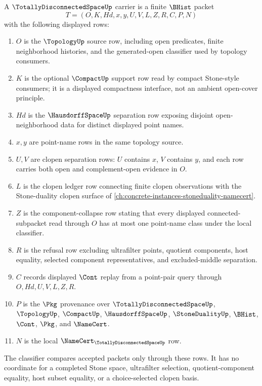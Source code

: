 \begin{definition}
\label{def:totally-disconnected-space-carrier}
A $\TotallyDisconnectedSpaceUp$ carrier is a finite $\BHist$ packet
$$
T=(O,K,Hd,x,y,U,V,L,Z,R,C,P,N)
$$
with the following displayed rows:
\begin{enumerate}
\item $O$ is the $\TopologyUp$ source row, including open predicates, finite neighborhood histories, and the generated-open classifier used by topology consumers.
\item $K$ is the optional $\CompactUp$ support row read by compact Stone-style consumers; it is a displayed compactness interface, not an ambient open-cover principle.
\item $Hd$ is the $\HausdorffSpaceUp$ separation row exposing disjoint open-neighborhood data for distinct displayed point names.
\item $x,y$ are point-name rows in the same topology source.
\item $U,V$ are clopen separation rows: $U$ contains $x$, $V$ contains $y$, and each row carries both open and complement-open evidence in $O$.
\item $L$ is the clopen ledger row connecting finite clopen observations with the Stone-duality clopen surface of \autoref{ch:concrete-instances-stoneduality-namecert}.
\item $Z$ is the component-collapse row stating that every displayed connected-subpacket read through $O$ has at most one point-name class under the local classifier.
\item $R$ is the refusal row excluding ultrafilter points, quotient components, host equality, selected component representatives, and excluded-middle separation.
\item $C$ records displayed $\Cont$ replay from a point-pair query through $O,Hd,U,V,L,Z,R$.
\item $P$ is the $\Pkg$ provenance over $\TotallyDisconnectedSpaceUp$, $\TopologyUp$, $\CompactUp$, $\HausdorffSpaceUp$, $\StoneDualityUp$, $\BHist$, $\Cont$, $\Pkg$, and $\NameCert$.
\item $N$ is the local $\NameCert_{\TotallyDisconnectedSpaceUp}$ row.
\end{enumerate}
The classifier compares accepted packets only through these rows. It has no coordinate for a completed Stone space, ultrafilter selection, quotient-component equality, host subset equality, or a choice-selected clopen basis.
\end{definition}

